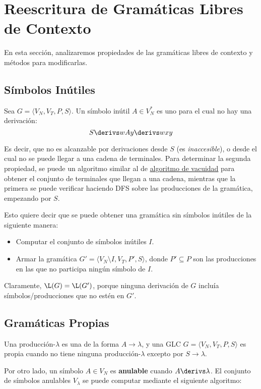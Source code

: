 \section{Reescritura de Gramáticas Libres de Contexto}

En esta sección, analizaremos propiedades de las gramáticas libres de contexto y métodos para modificarlas.

\subsection{Símbolos Inútiles}

Sea $G = \langle V_N, V_T, P, S \rangle$. Un símbolo inútil $A \in V_N^*$ es uno para el cual no hay una derivación:
$$
    S \derivs w A y \derivs w x y
$$

Es decir, que no es alcanzable por derivaciones desde $S$ (es \textit{inaccesible}), o desde el cual no se puede llegar a una cadena de terminales. Para determinar la segunda propiedad, se puede un algoritmo similar al de \hyperref[glc-vacia2]{algoritmo de vacuidad} para obtener el conjunto de terminales que llegan a una cadena, mientras que la primera se puede verificar haciendo DFS sobre las producciones de la gramática, empezando por $S$.

Esto quiere decir que se puede obtener una gramática sin símbolos inútiles de la siguiente manera:
\begin{itemize}
    \item Computar el conjunto de símbolos inútiles $I$.
    \item Armar la gramática $G' = \langle V_N \setminus I, V_T, P', S \rangle$, donde $P' \subseteq P$ son las producciones en las que no participa ningún símbolo de $I$.
\end{itemize}

Claramente, $\L(G) = \L(G')$, porque ninguna derivación de $G$ incluía símbolos/producciones que no estén en $G'$.

\subsection{Gramáticas Propias}

Una producción-$\lambda$ es una de la forma $A \to \lambda$, y una GLC $G = \langle V_N, V_T, P, S \rangle$ es propia cuando no tiene ninguna producción-$\lambda$ excepto por $S \to \lambda$.

Por otro lado, un símbolo $A \in V_N$ es \textbf{anulable} cuando $A \derivs \lambda$. El conjunto de símbolos anulables $V_\lambda$ se puede computar mediante el siguiente algoritmo:

